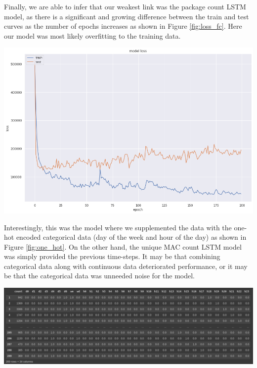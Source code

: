 \documentclass[journal, 12pt]{IEEEtran}
\begin{document}
Finally, we are able to infer that our weakest link was the package count LSTM model, as there is a significant and growing difference between the train and test curves as the number of epochs increases as shown in Figure \ref{fig:loss_fc}. Here our model was most likely overfitting to the training data. 

\begingroup
    \center
    \medskip
    \includegraphics[width=\columnwidth]{report/final_report/images/frame_count.png}
    \label{fig:loss_fc}
    \medskip
\endgroup

\noindent Interestingly, this was the model where we supplemented the data with the one-hot encoded categorical data (day of the week and hour of the day) as shown in Figure \ref{fig:one_hot}. On the other hand, the unique MAC count LSTM model was simply provided the previous time-steps. It may be that combining categorical data along with continuous data deteriorated performance, or it may be that the categorical data was unneeded noise for the model.

\begingroup
    \center
    \medskip
    \includegraphics[width=\columnwidth]{report/final_report/images/one_hot.png}
    \label{fig:one_hot}
    \medskip
\endgroup
\end{document}
